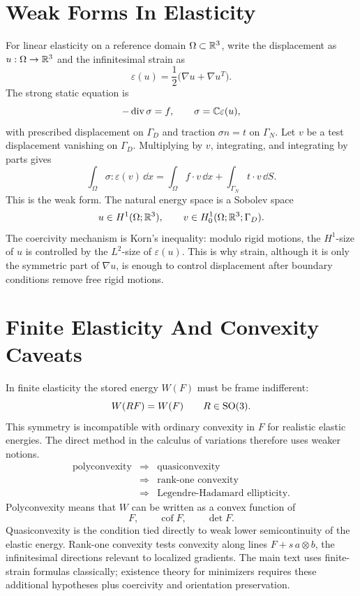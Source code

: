 \section{Weak Forms In Elasticity}
\label{sec:continuum-elasticity-weak-form}

For linear elasticity on a reference domain \(\Omega\subset\mathbb{R}^3\), write the
displacement as \(u:\Omega\to\mathbb{R}^3\) and the infinitesimal strain as
\[
        \varepsilon(u)=\frac{1}{2}\bigl(\nabla u+\nabla u^T\bigr).
\]
The strong static equation is
\[
        -\operatorname{div}\sigma=f,\qquad
        \sigma=\mathbb{C}\varepsilon(u),
\]
with prescribed displacement on \(\Gamma_D\) and traction
\(\sigma n=t\) on \(\Gamma_N\).  Let \(v\) be a test displacement vanishing on
\(\Gamma_D\).  Multiplying by \(v\), integrating, and integrating by parts gives
\[
        \int_\Omega \sigma:\varepsilon(v)\,\dd x
        =
        \int_\Omega f\cdot v\,\dd x+
        \int_{\Gamma_N}t\cdot v\,\dd S .
\]
This is the weak form.  The natural energy space is a Sobolev space
\[
        u\in H^1(\Omega;\mathbb{R}^3),\qquad
        v\in H^1_0(\Omega;\mathbb{R}^3;\Gamma_D).
\]
The coercivity mechanism is Korn's inequality: modulo rigid motions, the
\(H^1\)-size of \(u\) is controlled by the \(L^2\)-size of
\(\varepsilon(u)\).  This is why strain, although it is only the symmetric part
of \(\nabla u\), is enough to control displacement after boundary conditions
remove free rigid motions.

\section{Finite Elasticity And Convexity Caveats}
\label{sec:finite-elasticity-convexity-caveats}

In finite elasticity the stored energy \(W(F)\) must be frame indifferent:
\[
        W(RF)=W(F)\qquad R\in\operatorname{SO}(3).
\]
This symmetry is incompatible with ordinary convexity in \(F\) for realistic
elastic energies.  The direct method in the calculus of variations therefore
uses weaker notions.
\[
\begin{array}{ccl}
\text{polyconvexity} &\Longrightarrow& \text{quasiconvexity}\\
                    &\Longrightarrow& \text{rank-one convexity}\\
                    &\Longrightarrow& \text{Legendre-Hadamard ellipticity}.
\end{array}
\]
Polyconvexity means that \(W\) can be written as a convex function of
\[
        F,\qquad \operatorname{cof}F,\qquad \det F .
\]
Quasiconvexity is the condition tied directly to weak lower semicontinuity of
the elastic energy.  Rank-one convexity tests convexity along lines
\(F+s\,a\otimes b\), the infinitesimal directions relevant to localized
gradients.  The main text uses finite-strain formulas classically; existence
theory for minimizers requires these additional hypotheses plus coercivity and
orientation preservation.

